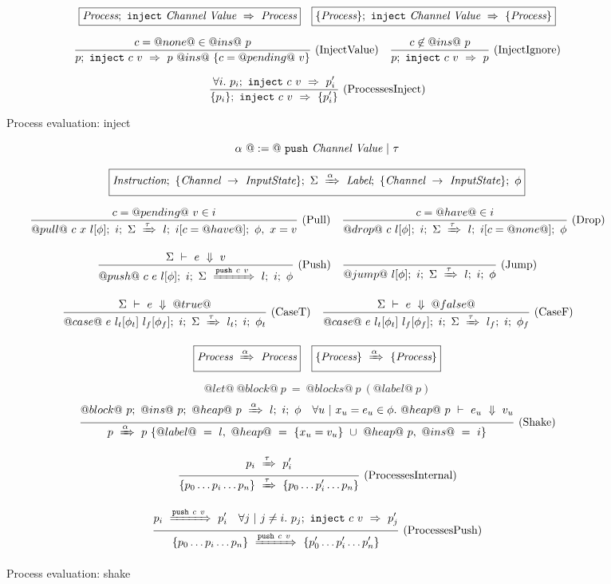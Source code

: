 
\begin{figure}

$$
\begin{array}{lr} 
  \boxed{\textit{Process};~\texttt{inject}~\textit{Channel}~\textit{Value}~\Rightarrow~\textit{Process}}
 & 
  \boxed{\{ \textit{Process} \};~\texttt{inject}~\textit{Channel}~\textit{Value}~\Rightarrow~\{ \textit{Process} \}}
 \end{array}
$$

$$
\enskip \frac {\displaystyle 
  c=@none@ \in @ins@~p
} {\displaystyle 
  p;~\texttt{inject}~c~v~\Rightarrow~p ~@ins@~ \{ c = @pending@~v\}
} \  \mbox{(InjectValue)} \enskip
\enskip \frac {\displaystyle 
  c \not\in @ins@~p
} {\displaystyle 
  p;~\texttt{inject}~c~v~\Rightarrow~p
} \  \mbox{(InjectIgnore)} \enskip
$$

$$
\enskip \frac {\displaystyle 
  \forall i.~ p_i;~\texttt{inject}~c~v~\Rightarrow~p'_i
} {\displaystyle 
  \{ p_i \};~\texttt{inject}~c~v~\Rightarrow~\{ p'_i \}
} \  \mbox{(ProcessesInject)} \enskip
$$

\caption{Process evaluation: inject}
\label{fig:Process:Eval:Inject}
\end{figure}


\begin{figure}

$$
\alpha~@:=@~ \texttt{push}~\textit{Channel}~\textit{Value} ~|~ \tau
$$

$$
  \boxed{
    \textit{Instruction};~\{\textit{Channel} ~\to~ \textit{InputState}\};~\Sigma~\xRightarrow{\alpha}~\textit{Label};~\{\textit{Channel} ~\to~ \textit{InputState}\};~\phi
  }
$$


$$
\enskip \frac {\displaystyle 
  c=@pending@~v \in i
} {\displaystyle 
  @pull@~c~x~l[\phi];~i;~\Sigma~\xRightarrow{\tau}~l;~i[c=@have@];~\phi,~x = v
} \  \mbox{(Pull)} \enskip
\enskip \frac {\displaystyle 
  c=@have@ \in i
} {\displaystyle 
  @drop@~c~l[\phi];~i;~\Sigma~\xRightarrow{\tau}~l;~i[c=@none@];~\phi
} \  \mbox{(Drop)} \enskip
$$

$$
\enskip \frac {\displaystyle 
  \Sigma~\vdash~e~\Downarrow~v
} {\displaystyle 
  @push@~c~e~l[\phi];~i;~\Sigma~\xRightarrow{\texttt{push}~c~v}~l;~i;~\phi
} \  \mbox{(Push)} \enskip
\enskip \frac {\displaystyle 
} {\displaystyle 
  @jump@~l[\phi];~i;~\Sigma~\xRightarrow{\tau}~l;~i;~\phi
} \  \mbox{(Jump)} \enskip
$$

$$
\enskip \frac {\displaystyle 
  \Sigma~\vdash~e~\Downarrow~@true@
} {\displaystyle 
  @case@~e~l_t[\phi_t]~l_f[\phi_f];~i;~\Sigma~\xRightarrow{\tau}~l_t;~i;~\phi_t
} \  \mbox{(CaseT)} \enskip
\enskip \frac {\displaystyle 
  \Sigma~\vdash~e~\Downarrow~@false@
} {\displaystyle 
  @case@~e~l_t[\phi_t]~l_f[\phi_f];~i;~\Sigma~\xRightarrow{\tau}~l_f;~i;~\phi_f
} \  \mbox{(CaseF)} \enskip
$$

$$
  \boxed{\textit{Process}~\xRightarrow{\alpha}~\textit{Process}}
  \quad
  \boxed{\{ \textit{Process} \}~\xRightarrow{\alpha}~\{ \textit{Process} \}}
$$

$$
@let@~@block@~p~=~@blocks@~p~(@label@~p)
$$
$$
\enskip \frac {\displaystyle 
  @block@~p;~@ins@~p;~@heap@~p~\xRightarrow{\alpha}~l;~i;~\phi
  \quad
  \forall u~|~x_u=e_u \in \phi.~
    @heap@~p~\vdash~e_u~\Downarrow~v_u
} {\displaystyle 
  p~\xRightarrow{\alpha}~p~\{ @label@~=~l,~@heap@~=~\{ x_u=v_u \}~\cup~@heap@~p,~@ins@~=~i \}
} \  \mbox{(Shake)} \enskip
$$




$$
\ruleIN{
  \ProcShake{p_i}{\tau}{p'_i}
}{
  \ProcsShake{
    \sgl{p_0 \ldots p_i \ldots p_n}
  }{\tau}{
    \sgl{p_0 \ldots p'_i \ldots p_n}
  }
}{ProcessesInternal}
$$

$$
\ruleIN{
  \ProcShake{p_i}{\Push~c~v}{p'_i}
  \quad
  \forall j~|~j \neq i.~
  \ProcInject{p_j}{c}{v}{p'_j}
}{
  \ProcsShake{
    \sgl{p_0 \ldots p_i \ldots p_n}
  }{\Push~c~v}{
    \sgl{p'_0 \ldots p'_i \ldots p'_n}
  }
}{ProcessesPush}
$$


\caption{Process evaluation: shake}
\label{fig:Process:Eval:Shake}
\end{figure}

